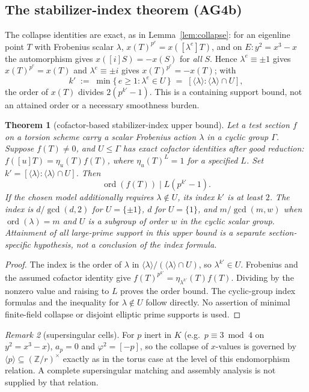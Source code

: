 \documentclass[11pt]{article}
\newtheorem{theorem}{Theorem}[section]
\theoremstyle{remark}
\newtheorem{remark}[theorem]{Remark}
\newcommand{\Z}{\mathbb{Z}}
\DeclareMathOperator{\ord}{ord}
\begin{document}
\subsection{The stabilizer-index theorem (AG4b)}

The collapse identities are exact, as in Lemma~\ref{lem:collapse}: for an
eigenline point $T$ with Frobenius scalar $\lambda$,
$x(T)^{p^e} = x([\lambda^e]T)$, and on $E : y^2 = x^3 - x$ the
automorphism gives $x([i]S) = -x(S)$ for \emph{all} $S$. Hence
$\lambda^e \equiv \pm 1$ gives $x(T)^{p^e} = x(T)$ and
$\lambda^e \equiv \pm i$ gives $x(T)^{p^e} = -x(T)$; with
\[
k' \;:=\; \min\{\, e \ge 1 : \lambda^e \in U \,\}
\;=\; [\langle\lambda\rangle : \langle\lambda\rangle \cap U],
\]
the order of $x(T)$ divides $2(p^{k'}-1)$. This is a containing support
bound, not an attained order or a necessary smoothness burden.

\begin{theorem}[cofactor-based stabilizer-index upper bound]\label{thm:stabindex}
Let a test section $f$ on a torsion scheme carry a scalar Frobenius
action $\lambda$ in a cyclic group $\Gamma$. Suppose $f(T)\ne0$, and
$U\le\Gamma$ has exact cofactor identities after good reduction:
$f([u]T)=\eta_u(T)f(T)$, where $\eta_u(T)^L=1$ for a specified $L$.
Set $k'=[\langle\lambda\rangle:\langle\lambda\rangle\cap U]$. Then
\[
\ord(f(T))\mid L(p^{k'}-1).
\]
If the chosen model additionally requires $\lambda\notin U$, its index
$k'$ is at least $2$. The index is $d/\gcd(d,2)$ for $U=\{\pm1\}$,
$d$ for $U=\{1\}$, and $m/\gcd(m,w)$ when $\ord(\lambda)=m$ and $U$ is
a subgroup of order $w$ in the cyclic scalar group. Attainment of all
large-prime support in this upper bound is a separate section-specific
hypothesis, not a conclusion of the index formula.
\end{theorem}

\begin{proof}
The index is the order of $\lambda$ in
$\langle\lambda\rangle/(\langle\lambda\rangle\cap U)$, so
$\lambda^{k'}\in U$. Frobenius and the assumed cofactor identity give
$f(T)^{p^{k'}}=\eta_{\lambda^{k'}}(T)f(T)$. Dividing by the nonzero value
and raising to $L$ proves the order bound. The cyclic-group index formulas
and the inequality for $\lambda\notin U$ follow directly. No assertion of
minimal finite-field collapse or disjoint elliptic prime supports is used.
\end{proof}

\begin{remark}[supersingular cells]
For $p$ inert in $K$ (e.g.\ $p \equiv 3 \bmod 4$ on $y^2 = x^3 - x$),
$a_p = 0$ and $\varphi^2 = [-p]$, so the collapse of $x$-values is
governed by $\langle p \rangle \subseteq (\Z/r)^\times$ exactly as in the
torus case at the level of this endomorphism relation. A complete
supersingular matching and assembly analysis is not supplied by that relation.
\end{remark}
\end{document}
